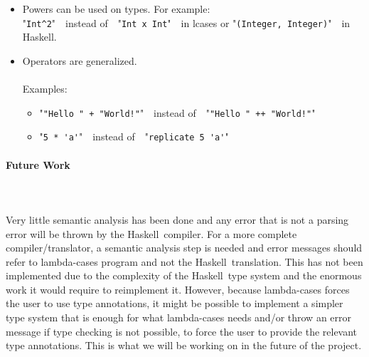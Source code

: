 \documentclass[diploma]{softlab-thesis}
\def\H{Haskell}
\def\pend{\mbox{}\\\\}
\begin{document}
\begin{itemize}
\begin{itemize}
\item
\begin{verbatim}
(cases, cases)
  (green, green) => true
  (amber, amber) => true
  (red, red) => true
  ... => false
\end{verbatim}
instead of
\begin{verbatim}
\x y -> case (x, y) of
  (Green, Green) => True
  (Amber, Amber) => True
  (Red, Red) => True
  _ => False
\end{verbatim}
\end{itemize}

\item Powers can be used on types.  For example:\\

"\verb|Int^2|"\ \  instead of\ \  "\verb|Int x Int|"\ \  in lcases or
"\verb|(Integer, Integer)|"\ \
in \H. \\

\item Operators are generalized. \\\\
Examples:

\begin{itemize}

\item
"\verb|"Hello " + "World!"|"\ \ instead of\ \ "\verb|"Hello " ++ "World!"|"

\item
"\verb|5 * 'a'|"\ \ instead of\ \ "\verb|replicate 5 'a'|"

\end{itemize}


\end{itemize}

\newpage
\paragraph{Future Work}\pend
Very little semantic analysis has been done and any error that is not a
parsing error will be thrown by the \H\ compiler. For a more complete
compiler/translator, a semantic analysis step is needed and error messages
should refer to lambda-cases program and not the \H\ translation. This has not
been implemented due to the complexity of the \H\ type system and the enormous
work it would require to reimplement it. However, because lambda-cases forces
the user to use type annotations, it might be possible to implement a simpler
type system that is enough for what lambda-cases needs and/or throw an error
message if type checking is not possible, to force the user to provide the
relevant type annotations. This is what we will be working on in the future
of the project.



\nocite{*}






\backmatter

\appendix

\end{document}
